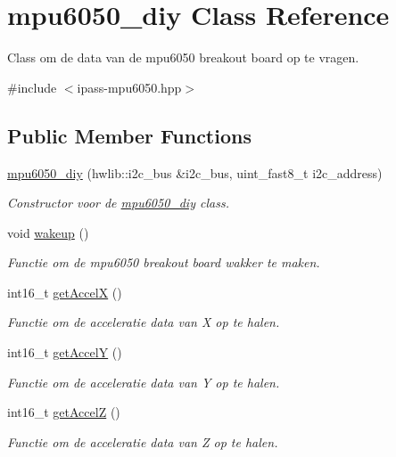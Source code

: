 \hypertarget{classmpu6050__diy}{}\section{mpu6050\+\_\+diy Class Reference}
\label{classmpu6050__diy}


Class om de data van de mpu6050 breakout board op te vragen.  




{\ttfamily \#include $<$ipass-\/mpu6050.\+hpp$>$}

\subsection*{Public Member Functions}
\begin{DoxyCompactItemize}
\item 
\hyperlink{classmpu6050__diy_a8e7f3cddfb5d527053939d0c7ba72434}{mpu6050\+\_\+diy} (hwlib\+::i2c\+\_\+bus \&i2c\+\_\+bus, uint\+\_\+fast8\+\_\+t i2c\+\_\+address)
\begin{DoxyCompactList}\small\item\em Constructor voor de \hyperlink{classmpu6050__diy}{mpu6050\+\_\+diy} class. \end{DoxyCompactList}\item 
void \hyperlink{classmpu6050__diy_ad641ac94fcef07143af1fa4e88a7d963}{wakeup} ()
\begin{DoxyCompactList}\small\item\em Functie om de mpu6050 breakout board wakker te maken. \end{DoxyCompactList}\item 
int16\+\_\+t \hyperlink{classmpu6050__diy_a5fc73907cdcf72962fda6f312e993c52}{get\+AccelX} ()
\begin{DoxyCompactList}\small\item\em Functie om de acceleratie data van X op te halen. \end{DoxyCompactList}\item 
int16\+\_\+t \hyperlink{classmpu6050__diy_a4fe4d0a613ab2f168b294524badbc441}{get\+AccelY} ()
\begin{DoxyCompactList}\small\item\em Functie om de acceleratie data van Y op te halen. \end{DoxyCompactList}\item 
int16\+\_\+t \hyperlink{classmpu6050__diy_a077bbed10dbd5c28aec9a0126624d85f}{get\+AccelZ} ()
\begin{DoxyCompactList}\small\item\em Functie om de acceleratie data van Z op te halen. \end{DoxyCompactList}\item 

\end{DoxyCompactItemize}
